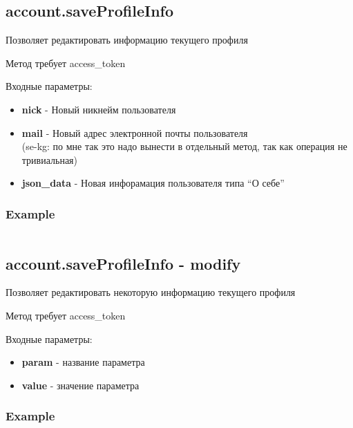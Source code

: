 \subsection{account.saveProfileInfo}
Позволяет редактировать информацию текущего профиля

Метод требует access\_token

Входные параметры:
\begin{itemize}
  \item \textbf{nick} - Новый никнейм пользователя
  \item \textbf{mail} - Новый адрес электронной почты пользователя\\
  (se-kg: по мне так это надо вынести в отдельный метод, так как операция не тривиальная)
  \item \textbf{json\_data} - Новая инфорамация пользователя типа “О себе”
\end{itemize}

\subsubsection{Example}
\begin{Verbatim}[frame=single]

\end{Verbatim}

\subsection{account.saveProfileInfo - modify}
Позволяет редактировать некоторую информацию текущего профиля

Метод требует access\_token

Входные параметры:
\begin{itemize}
  \item \textbf{param} - название параметра
  \item \textbf{value} - значение параметра
\end{itemize}

\subsubsection{Example}
\begin{Verbatim}[frame=single]

\end{Verbatim}
